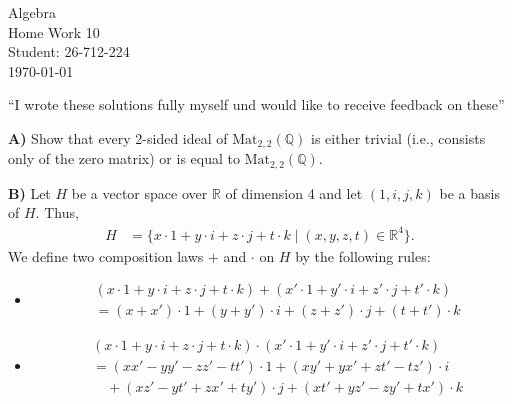 \documentclass[12pt,a4paper]{article}
\begin{document}
\begin{titlepage}
\centering
\vspace*{\fill}
{\Huge Algebra}\\[0.5cm]
{\Huge Home Work 10}\\[1.5cm]
{\Large Student: 26-712-224}\\[0.5cm]
{\Large \today}\par
\vspace{2cm}
{\normalsize ``I wrote these solutions fully myself und would like to receive feedback on these''\par}
\vspace*{\fill}
\end{titlepage}

\noindent\textbf{A)} Show that every 2-sided ideal of $\mathrm{Mat}_{2,2}(\mathbb{Q})$
is either trivial (i.e., consists only of the zero matrix) or is equal to
$\mathrm{Mat}_{2,2}(\mathbb{Q})$.

\newpage

\noindent\textbf{B)} Let $H$ be a vector space over $\mathbb{R}$ of dimension 4
and let $(1,i,j,k)$ be a basis of $H$. Thus,
\begin{align*}
H &= \{x\cdot 1+y\cdot i+z\cdot j+t\cdot k \mid
(x,y,z,t)\in\mathbb{R}^4\}.
\end{align*}
We define two composition laws $+$ and $\cdot$ on $H$ by the following rules:
\begin{itemize}
\item
\begin{align*}
& (x\cdot 1+y\cdot i+z\cdot j+t\cdot k)
 +(x'\cdot 1+y'\cdot i+z'\cdot j+t'\cdot k)\\
&= (x+x')\cdot 1+(y+y')\cdot i+(z+z')\cdot j+(t+t')\cdot k
\end{align*}
\item
\begin{align*}
& (x\cdot 1+y\cdot i+z\cdot j+t\cdot k)
 \cdot(x'\cdot 1+y'\cdot i+z'\cdot j+t'\cdot k)\\
&= (xx'-yy'-zz'-tt')\cdot 1+(xy'+yx'+zt'-tz')\cdot i\\
&\quad +(xz'-yt'+zx'+ty')\cdot j+(xt'+yz'-zy'+tx')\cdot k
\end{align*}
\end{itemize}
\end{document}
